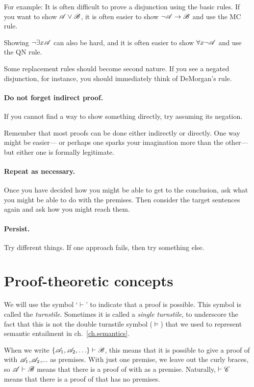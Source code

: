 For example: It is often difficult to prove a disjunction using the basic rules. If you want to show $\mathscr{A}\vee\mathscr{B}$, it is often easier to show $\neg\mathscr{A}\rightarrow\mathscr{B}$ and use the MC rule.

Showing $\neg \exists x\mathscr{A}$ can also be hard, and it is often easier to show  $\forall x\neg \mathscr{A}$ and use the QN rule.

Some replacement rules should become second nature. If you see a negated disjunction, for instance, you should immediately think of DeMorgan's rule.

\paragraph{Do not forget indirect proof.}
If you cannot find a way to show something directly, try assuming its negation.

Remember that most proofs can be done either indirectly or directly. One way might be easier--- or perhaps one sparks your imagination more than the other--- but either one is formally legitimate.

\paragraph{Repeat as necessary.} Once you have decided how you might be able to get to the conclusion, ask what you might be able to do with the premises. Then consider the target sentences again and ask how you might reach them.

\paragraph{Persist.}
Try different things. If one approach fails, then try something else.




\section{Proof-theoretic concepts}

We will use the symbol `$\vdash$' to indicate that a proof is possible. This symbol is called the \emph{turnstile}. Sometimes it is called a \emph{single turnstile}, to underscore the fact that this is not the {double turnstile} symbol ($\models$) that we used to represent semantic entailment in ch.~\ref{ch.semantics}.

When we write $\{\mathscr{A}_1,\mathscr{A}_2,\ldots\}\vdash\mathscr{B}$, this means that it is possible to give a proof of  with $\mathscr{A}_1$,$\mathscr{A}_2$,$\ldots$ as premises. With just one premise, we leave out the curly braces, so $\mathscr{A}\vdash\mathscr{B}$ means that there is a proof of  with  as a premise. Naturally, $\vdash\mathscr{C}$ means that there is a proof of  that has no premises.

